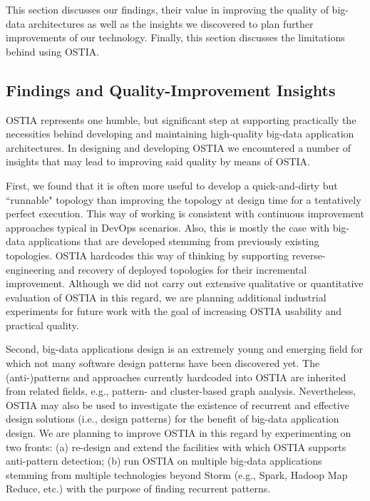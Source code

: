 This section discusses our findings, their value in improving the quality of big-data architectures as well as the insights we discovered to plan further improvements of our technology. Finally, this section discusses the limitations behind using OSTIA.

\subsection{Findings and Quality-Improvement Insights}
OSTIA represents one humble, but significant step at supporting practically the necessities behind developing and maintaining high-quality big-data application architectures. In designing and developing OSTIA we encountered a number of insights that may lead to improving said quality by means of OSTIA.

First, we found that it is often more useful to develop a quick-and-dirty but ``runnable" topology than improving the topology at design time for a tentatively perfect execution. This way of working is consistent with continuous improvement approaches typical in DevOps scenarios. Also, this is mostly the case with big-data applications that are developed stemming from previously existing topologies. OSTIA hardcodes this way of thinking by supporting reverse-engineering and recovery of deployed topologies for their incremental improvement. Although we did not carry out extensive qualitative or quantitative evaluation of OSTIA in this regard, we are planning additional industrial experiments for future work with the goal of increasing OSTIA usability and practical quality.

Second, big-data applications design is an extremely young and emerging field for which not many software design patterns have been discovered yet. The (anti-)patterns and approaches currently hardcoded into OSTIA are inherited from related fields, e.g., pattern- and cluster-based graph analysis. Nevertheless, OSTIA may also be used to investigate the existence of recurrent and effective design solutions (i.e., design patterns) for the benefit of big-data application design. We are planning to improve OSTIA in this regard by experimenting on two fronts: (a) re-design and extend the facilities with which OSTIA supports anti-pattern detection; (b) run OSTIA on multiple big-data applications stemming from multiple technologies beyond Storm (e.g., Spark, Hadoop Map Reduce, etc.) with the purpose of finding recurrent patterns. 

